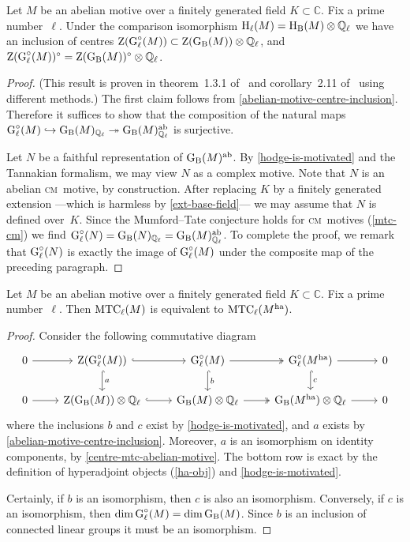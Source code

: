 \documentclass[10pt,twoside,leqno]{article}
\numberwithin{equation}{subsection}
\newcommand{\into}{\hookrightarrow}
\newcommand{\onto}{\twoheadrightarrow}
\newcommand{\QQ}{\mathbb{Q}}
\newcommand{\QQl}{\QQ_{\ell}}
\newcommand{\CC}{\mathbb{C}}
\newcommand{\ab}{\textnormal{ab}}
\newcommand{\ha}{\textnormal{ha}}
\newcommand{\HH}{\textnormal{H}}
\newcommand{\Hl}{\HH_{\ell}}
\newcommand{\HB}{\HH_{\textnormal{B}}}
\newcommand{\Zentrum}{\textnormal{Z}}
\newcommand{\GG}{\textnormal{G}}
\newcommand{\GB}{\GG_{\textnormal{B}}}
\newcommand{\Gl}{\GG_{\ell}}
\newcommand{\Glc}{\Gl^{\circ}}
\newcommand{\cm}{\textsc{cm}}
\newcommand{\MTC}{\textnormal{MTC}}
\begin{document}
\begin{lemma} %
 \label{centre-mtc-abelian-motive}
 Let $M$ be an abelian motive over
 a finitely generated field $K \subset \CC$.
 Fix a prime number~$\ell$.
 Under the comparison isomorphism $\Hl(M) = \HB(M) \otimes \QQl$
 we have an inclusion of centres
 $\Zentrum(\Glc(M)) \subset \Zentrum(\GB(M)) \otimes \QQl$, and
 $\Zentrum(\Glc(M))^\circ = \Zentrum(\GB(M))^\circ \otimes \QQl$.
 \begin{proof}
  (This result is proven in theorem~1.3.1 of~\cite{Va08}
  and corollary~2.11 of~\cite{UY13} using different methods.)
  The first claim follows from \cref{abelian-motive-centre-inclusion}.
  Therefore it suffices to show that the composition
  of the natural maps
  $\Glc(M) \into \GB(M)_{\QQl} \onto \GB(M)^\ab_{\QQl}$
  is surjective.

  Let $N$ be a faithful representation of $\GB(M)^\ab$.
  By \cref{hodge-is-motivated} and the Tannakian formalism,
  we may view $N$ as a complex motive.
  Note that $N$ is an abelian \cm~motive, by construction.
  After replacing $K$ by a finitely generated extension%
  ---which is harmless by \cref{ext-base-field}---%
  we may assume that $N$ is defined over~$K$.
  Since the Mumford--Tate conjecture holds for \cm~motives (\cref{mtc-cm})
  we find $\Glc(N) = \GB(N)_{\QQl} = \GB(M)^\ab_{\QQl}$.
  To complete the proof,
  we remark that $\Glc(N)$ is exactly the image of $\Glc(M)$
  under the composite map of the preceding paragraph.
 \end{proof}
\end{lemma}

\begin{proposition} %
 \label{mtc-adjoint-motive}
 Let $M$ be an abelian motive over
 a finitely generated field $K \subset \CC$.
 Fix a prime number~$\ell$.
 Then $\MTC_\ell(M)$
 is equivalent to $\MTC_\ell(M^\ha)$.
 \begin{proof}
  Consider the following commutative diagram
  \[
   \begin{tikzcd}
    0 \ar[r] &
    \Zentrum(\Glc(M)) \ar[r,hook] \ar[d,hook,"a"] &
    \Glc(M) \ar[r,two heads] \ar[d,hook,"b"] &
    \Glc(M^\ha) \ar[d,hook,"c"] \ar[r] &
    0 \\
    0 \ar[r] &
    \Zentrum(\GB(M)) \otimes \QQl \ar[r,hook] &
    \GB(M) \otimes \QQl \ar[r,two heads] &
    \GB(M^\ha) \otimes \QQl \ar[r] &
    0
   \end{tikzcd}
  \]
  where the inclusions $b$ and $c$ exist by \cref{hodge-is-motivated},
  and $a$ exists by \cref{abelian-motive-centre-inclusion}.
  Moreover, $a$ is an isomorphism on identity components,
  by \cref{centre-mtc-abelian-motive}.
  The bottom row is exact by
  the definition of hyperadjoint objects (\cref{ha-obj})
  and \cref{hodge-is-motivated}.
  
  Certainly, if $b$ is an isomorphism, then $c$ is also an isomorphism.
  Conversely, if $c$ is an isomorphism,
  then $\dim \Glc(M) = \dim \GB(M)$.
  Since $b$ is an inclusion of connected linear groups
  it must be an isomorphism.
 \end{proof}
\end{proposition}
\end{document}
